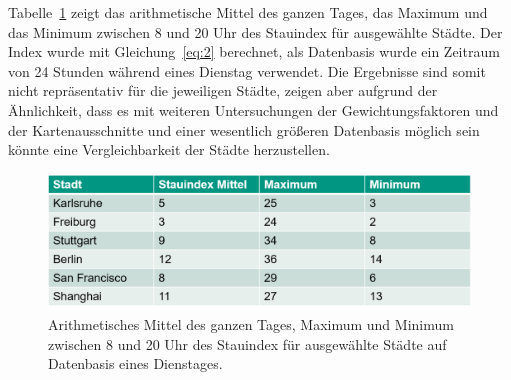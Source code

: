 Tabelle~\ref{fig:index_tabelle} zeigt das arithmetische Mittel des ganzen Tages, das Maximum und das Minimum zwischen 8 und 20 Uhr des Stauindex für ausgewählte Städte. Der Index wurde mit Gleichung~\ref{eq:2} berechnet, als Datenbasis wurde ein Zeitraum von 24 Stunden während eines Dienstag verwendet. Die Ergebnisse sind somit nicht repräsentativ für die jeweiligen Städte, zeigen aber aufgrund der Ähnlichkeit, dass es mit weiteren Untersuchungen der Gewichtungsfaktoren und der Kartenausschnitte und einer wesentlich größeren Datenbasis möglich sein könnte eine Vergleichbarkeit der Städte herzustellen.





\begin{figure}
  \centering
    \includegraphics[width=1.0\textwidth]{images/index_tabelle.png}
    \caption{Arithmetisches Mittel des ganzen Tages, Maximum und Minimum zwischen 8 und 20 Uhr des Stauindex für ausgewählte Städte auf Datenbasis eines Dienstages.}
    \label{fig:index_tabelle}
\end{figure}